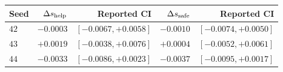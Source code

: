 \begin{tabular}{lrrrr}
\toprule
Seed & $\Delta s_{\rm help}$ & Reported CI & $\Delta s_{\rm safe}$ & Reported CI\\
\midrule
$42$ & $-0.0003$ & $[-0.0067,+0.0058]$ & $-0.0010$ & $[-0.0074,+0.0050]$\\
$43$ & $+0.0019$ & $[-0.0038,+0.0076]$ & $+0.0004$ & $[-0.0052,+0.0061]$\\
$44$ & $-0.0033$ & $[-0.0086,+0.0023]$ & $-0.0037$ & $[-0.0095,+0.0017]$\\
\bottomrule
\end{tabular}
